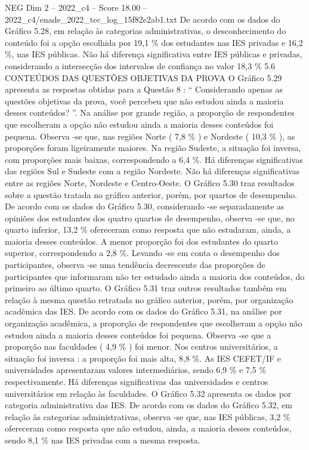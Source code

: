 \begin{textsample}{NEG Dim 2 – 2022\_c4 – Score 18.00 – 2022\_c4/enade\_2022\_tec\_log\_15f82e2ab1.txt}
De acordo com os dados do Gráfico 5.28, em relação às categorias administrativas, o desconhecimento do conteúdo foi a opção escolhida por 19,1 \% dos estudantes nas IES privadas e 16,2 \%, nas IES públicas.
Não há diferença significativa entre IES públicas e privadas, considerando a intersecção dos intervalos de confiança no valor 18,3 \% 5.6 CONTEÚDOS DAS QUESTÕES OBJETIVAS DA PROVA O Gráfico 5.29 apresenta as respostas obtidas para a Questão 8 : “ Considerando apenas as questões objetivas da prova, você percebeu que não estudou ainda a maioria desses conteúdos? ”.
Na análise por grande região, a proporção de respondentes que escolheram a opção não estudou ainda a maioria desses conteúdos foi pequena.
Observa -se que, nas regiões Norte ( 7,8 \% ) e Nordeste ( 10,3 \% ), as proporções foram ligeiramente maiores.
Na região Sudeste, a situação foi inversa, com proporções mais baixas, correspondendo a 6,4 \%.
Há diferenças significativas das regiões Sul e Sudeste com a região Nordeste.
Não há diferenças significativas entre as regiões Norte, Nordeste e Centro-Oeste.
O Gráfico 5.30 traz resultados sobre a questão tratada no gráfico anterior, porém, por quartos de desempenho.
De acordo com os dados do Gráfico 5.30, considerando -se separadamente as opiniões dos estudantes dos quatro quartos de desempenho, observa -se que, no quarto inferior, 13,2 \% ofereceram como resposta que não estudaram, ainda, a maioria desses conteúdos.
A menor proporção foi dos estudantes do quarto superior, correspondendo a 2,8 \%.
Levando -se em conta o desempenho dos participantes, observa -se uma tendência decrescente das proporções de participantes que informaram não ter estudado ainda a maioria dos conteúdos, do primeiro ao último quarto.
O Gráfico 5.31 traz outros resultados também em relação à mesma questão retratada no gráfico anterior, porém, por organização acadêmica das IES.
De acordo com os dados do Gráfico 5.31, na análise por organização acadêmica, a proporção de respondentes que escolheram a opção não estudou ainda a maioria desses conteúdos foi pequena.
Observa -se que a proporção nas faculdades ( 4,9 \% ) foi menor.
Nos centros universitários, a situação foi inversa : a proporção foi mais alta, 8,8 \%.
As IES CEFET/IF e universidades apresentaram valores intermediários, sendo 6,9 \% e 7,5 \% respectivamente.
Há diferenças significativas das universidades e centros universitários em relação às faculdades.
O Gráfico 5.32 apresenta os dados por categoria administrativa das IES.
De acordo com os dados do Gráfico 5.32, em relação às categorias administrativas, observa -se que, nas IES públicas, 3,2 \% ofereceram como resposta que não estudou, ainda, a maioria desses conteúdos, sendo 8,1 \% nas IES privadas com a mesma resposta.

\end{textsample}
